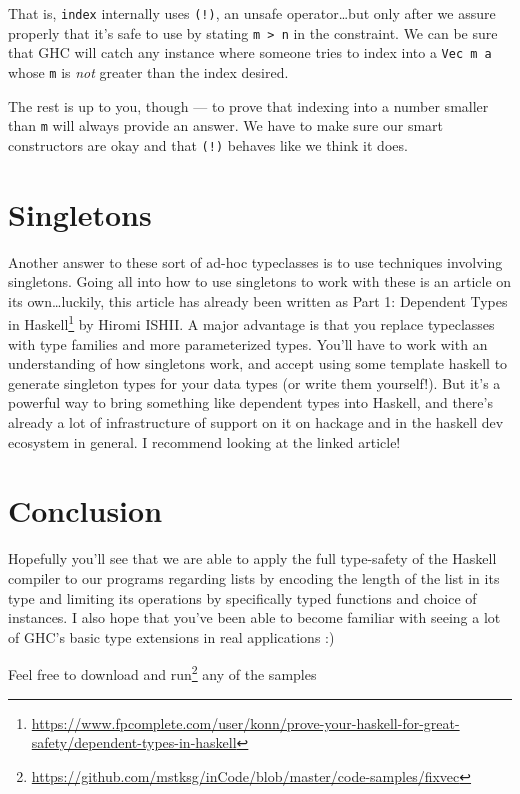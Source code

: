 \documentclass[]{article}
\renewcommand{\href}[2]{#2\footnote{\url{#1}}}
\begin{document}
That is, \texttt{index} internally uses \texttt{(!)}, an unsafe
operator\ldots{}but only after we assure properly that it's safe to use by
stating \texttt{m\ \textgreater{}\ n} in the constraint. We can be sure that GHC
will catch any instance where someone tries to index into a \texttt{Vec\ m\ a}
whose \texttt{m} is \emph{not} greater than the index desired.

The rest is up to you, though --- to prove that indexing into a number smaller
than \texttt{m} will always provide an answer. We have to make sure our smart
constructors are okay and that \texttt{(!)} behaves like we think it does.

\hypertarget{singletons}{%
\section{Singletons}\label{singletons}}

Another answer to these sort of ad-hoc typeclasses is to use techniques
involving singletons. Going all into how to use singletons to work with these is
an article on its own\ldots{}luckily, this article has already been written as
\href{https://www.fpcomplete.com/user/konn/prove-your-haskell-for-great-safety/dependent-types-in-haskell}{Part
1: Dependent Types in Haskell} by Hiromi ISHII. A major advantage is that you
replace typeclasses with type families and more parameterized types. You'll have
to work with an understanding of how singletons work, and accept using some
template haskell to generate singleton types for your data types (or write them
yourself!). But it's a powerful way to bring something like dependent types into
Haskell, and there's already a lot of infrastructure of support on it on hackage
and in the haskell dev ecosystem in general. I recommend looking at the linked
article!

\hypertarget{conclusion}{%
\section{Conclusion}\label{conclusion}}

Hopefully you'll see that we are able to apply the full type-safety of the
Haskell compiler to our programs regarding lists by encoding the length of the
list in its type and limiting its operations by specifically typed functions and
choice of instances. I also hope that you've been able to become familiar with
seeing a lot of GHC's basic type extensions in real applications :)

Feel free to
\href{https://github.com/mstksg/inCode/blob/master/code-samples/fixvec}{download
and run} any of the samples
\end{document}
